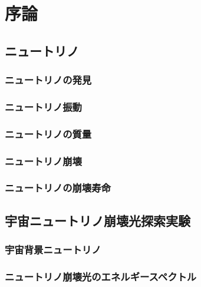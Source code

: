 \chapter{序論}
\section{ニュートリノ}																		%
\subsection{ニュートリノの発見}																%
\subsection{ニュートリノ振動}																	%
\subsection{ニュートリノの質量}																%
\subsection{ニュートリノ崩壊}																	%
\subsection{ニュートリノの崩壊寿命}															%
\section{宇宙ニュートリノ崩壊光探索実験}														%
\subsection{宇宙背景ニュートリノ}																%
\subsection{ニュートリノ崩壊光のエネルギースペクトル}												%

